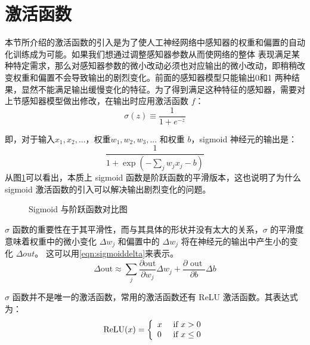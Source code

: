 \section{激活函数}
本节所介绍的激活函数的引入是为了使人工神经网络中感知器的权重和偏置的自动化训练成为可能。如果我们想通过调整感知器参数从而使网络的整体
表现满足某种特定需求，那么对感知器参数的微小改动必须也对应输出的微小改动，即稍稍改变权重和偏置不会导致输出的剧烈变化。前面的感知器模型只能输出0和1
两种结果，显然不能满足输出缓慢变化的特征。为了得到满足这种特征的感知器，需要对上节感知器模型做出修改，在输出时应用激活函数 $f$：
\begin{equation}
	\label{eqn:sigmoid}
	\sigma ( z ) \equiv \frac { 1 } { 1 + e ^ { - z } }
\end{equation}

即，对于输入$x_1, x_2, ...$，权重$w_1, w_2, w_3,...$ 和权重 $b$，sigmoid 神经元的输出是：
\begin{equation}
	\label{eqn:sigmoidout}
	\frac { 1 } { 1 + \exp \left( - \sum _ { j } w _ { j } x _ { j } - b \right) }
\end{equation}
从图\ref{sigmoid_step}可以看出，本质上 sigmoid 函数是阶跃函数的平滑版本，这也说明了为什么 sigmoid 激活函数的引入可以解决输出剧烈变化的问题。

\begin{figure}[htbp]
	\caption{Sigmoid 与阶跃函数对比图}
	\label{sigmoid_step}
\end{figure}

$\sigma$ 函数的重要性在于其平滑性，而与其具体的形状并没有太大的关系，$\sigma$ 的平滑度意味着权重中的微小变化
$\Delta w_j$ 和偏置中的 $\Delta w_j$ 将在神经元的输出中产生小的变化 $\Delta out$。
这可以用\ref{eqn:sigmoiddelta}来表示。
\begin{equation}
	\label{eqn:sigmoiddelta}
	\Delta \mathrm { out } \approx \sum _ { j } \frac { \partial \mathrm { out } } { \partial w _ { j } } \Delta w _ { j } + \frac { \partial \text { out } } { \partial b } \Delta b
\end{equation}

$\sigma$ 函数并不是唯一的激活函数，常用的激活函数还有 ReLU 激活函数。其表达式为：
\begin{equation}
	\label{eqn:relu}
	\operatorname { ReLU } ( x ) = \left\{ \begin{array} { l l } { x } & { \text { if } x > 0 } \\ { 0 } & { \text { if } x \leq 0 } \end{array} \right.
\end{equation}

